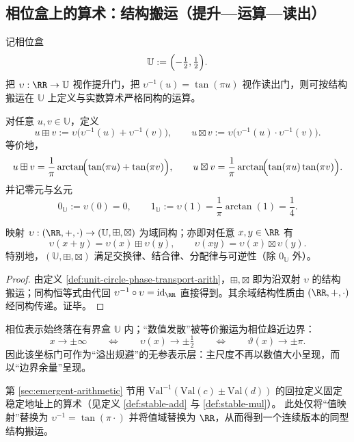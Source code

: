 \subsection{相位盒上的算术：结构搬运（提升—运算—读出）}\label{subsec:unit-circle-phase-arithmetic}
记相位盒
\[
\mathbb{U}:=\Bigl(-\tfrac12,\tfrac12\Bigr).
\]
把 \(\upsilon:\RR\to\mathbb{U}\) 视作提升门，把 \(\upsilon^{-1}(u)=\tan(\pi u)\) 视作读出门，则可按结构搬运在 \(\mathbb{U}\) 上定义与实数算术严格同构的运算。

\begin{definition}\label{def:unit-circle-phase-transport-arith}
对任意 \(u,v\in\mathbb{U}\)，定义
\[
u\boxplus v
:=\upsilon\!\bigl(\upsilon^{-1}(u)+\upsilon^{-1}(v)\bigr),
\qquad
u\boxtimes v
:=\upsilon\!\bigl(\upsilon^{-1}(u)\cdot\upsilon^{-1}(v)\bigr).
\]
等价地，
\[
u\boxplus v=\frac{1}{\pi}\arctan\!\Bigl(\tan(\pi u)+\tan(\pi v)\Bigr),
\qquad
u\boxtimes v=\frac{1}{\pi}\arctan\!\Bigl(\tan(\pi u)\tan(\pi v)\Bigr).
\]
并记零元与幺元
\[
0_{\mathbb{U}}:=\upsilon(0)=0,
\qquad
1_{\mathbb{U}}:=\upsilon(1)=\frac{1}{\pi}\arctan(1)=\frac14.
\]
\end{definition}

\begin{theorem}[与实数域严格同构]\label{thm:unit-circle-phase-field-iso}
映射
\(
\upsilon:(\RR,+,\cdot)\to(\mathbb{U},\boxplus,\boxtimes)
\)
为域同构；亦即对任意 \(x,y\in\RR\) 有
\[
\upsilon(x+y)=\upsilon(x)\boxplus\upsilon(y),
\qquad
\upsilon(xy)=\upsilon(x)\boxtimes\upsilon(y).
\]
特别地，\((\mathbb{U},\boxplus,\boxtimes)\) 满足交换律、结合律、分配律与可逆性（除 \(0_{\mathbb{U}}\) 外）。
\end{theorem}
\begin{proof}
由定义 \ref{def:unit-circle-phase-transport-arith}，\(\boxplus,\boxtimes\) 即为沿双射 \(\upsilon\) 的结构搬运；同构恒等式由代回 \(\upsilon^{-1}\circ \upsilon=\mathrm{id}_\RR\) 直接得到。其余域结构性质由 \((\RR,+,\cdot)\) 经同构传递。证毕。
\end{proof}

\begin{remark}[有界表示与边界承载发散]\label{rem:unit-circle-phase-bounded}
相位表示始终落在有界盒 \(\mathbb{U}\) 内；“数值发散”被等价搬运为相位趋近边界：
\[
x\to\pm\infty\qquad\Longleftrightarrow\qquad \upsilon(x)\to\pm\tfrac12
\qquad\Longleftrightarrow\qquad \vartheta(x)\to\pm\pi.
\]
因此该坐标门可作为“溢出规避”的无参表示层：主尺度不再以数值大小呈现，而以“边界余量”呈现。
\end{remark}

\begin{remark}\label{rem:unit-circle-phase-transport-analogy}
第 \ref{sec:emergent-arithmetic} 节用 \( \mathrm{Val}^{-1}(\mathrm{Val}(c)\pm\mathrm{Val}(d)) \) 的回拉定义固定稳定地址上的算术（见定义 \ref{def:stable-add} 与 \ref{def:stable-mul}）。
此处仅将“值映射”替换为 \(\upsilon^{-1}=\tan(\pi\cdot)\) 并将值域替换为 \(\RR\)，从而得到一个连续版本的同型结构搬运。
\end{remark}
